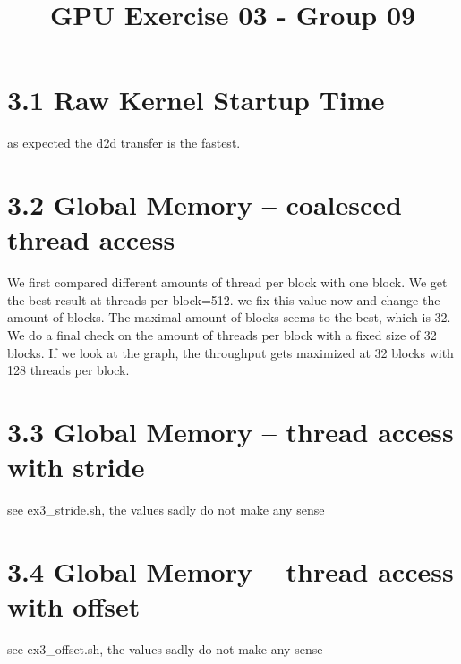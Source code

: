 \documentclass{report}
\begin{document}
\title{GPU Exercise 03 - Group 09}
\maketitle


\section*{3.1 Raw Kernel Startup Time}
as expected the d2d transfer is the fastest. 

\section*{3.2 Global Memory – coalesced thread access}
We first compared different amounts of thread per block with one block.
We get the best result at threads per block=512.
we fix this value now and change the amount of blocks.
The maximal amount of blocks seems to the best, which is 32.
We do a final check on the amount of threads per block with a fixed size of 32 blocks.
If we look at the graph, the throughput gets maximized at 32 blocks with 128 threads per block.
\section*{3.3 Global Memory – thread access with stride}
see ex3_stride.sh, the values sadly do not make any sense
\section*{3.4 Global Memory – thread access with offset}
see ex3_offset.sh, the values sadly do not make any sense
\end{document}

